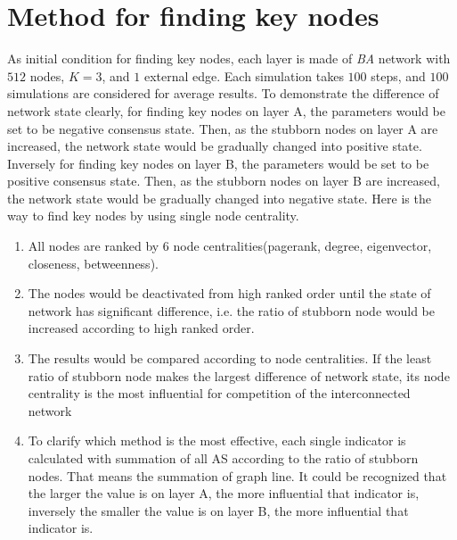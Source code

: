 \section{Method for finding key nodes}
\label{sec:method for finding key nodes}
As initial condition for finding key nodes, each layer is made of \textit{BA} network with $512$ nodes, $K=3$, and $1$ external edge. Each simulation takes $100$ steps, and $100$ simulations are considered for average results. To demonstrate the difference of network state clearly, for finding key nodes on layer A, the parameters would be set to be negative consensus state. Then, as the stubborn nodes on layer A are increased, the network state would be gradually changed into positive state. Inversely for finding key nodes on layer B, the parameters would be set to be positive consensus state. Then, as the stubborn nodes on layer B are increased, the network state would be gradually changed into negative state.
Here is the way to find key nodes by using single node centrality.
\begin{enumerate}
	\item All nodes are ranked by 6 node centralities(pagerank, degree, eigenvector, closeness, betweenness).
	\item The nodes would be deactivated from high ranked order until the state of network has significant difference, i.e. the ratio of stubborn node would be increased according to high ranked order. 
	\item The results would be compared according to node centralities. If the least ratio of stubborn node makes the largest difference of network state, its node centrality is the most influential for competition of the interconnected network
	\item To clarify which method is the most effective, each single indicator is calculated with summation of all AS according to the ratio of stubborn nodes. That means the summation of graph line. It could be recognized that the larger the value is on layer A, the more influential that indicator is, inversely the smaller the value is on layer B, the more influential that indicator is.
\end{enumerate}

